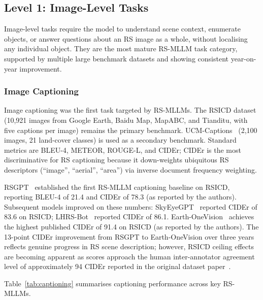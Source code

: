 \subsection{Level 1: Image-Level Tasks}\label{sec4:image}

Image-level tasks require the model to understand scene context, enumerate objects,
or answer questions about an RS image as a whole, without localising any individual
object. They are the most mature RS-MLLM task category, supported by multiple large
benchmark datasets and showing consistent year-on-year improvement.

\subsubsection{Image Captioning}\label{sec4:caption}

Image captioning was the first task targeted by RS-MLLMs. The RSICD
dataset~\cite{rsicd2017} (10,921 images from Google Earth, Baidu Map, MapABC, and
Tianditu, with five captions per image) remains the primary benchmark.
UCM-Captions~\cite{ucmcaptions2016} (2,100 images, 21 land-cover classes) is used
as a secondary benchmark. Standard metrics are BLEU-4, METEOR, ROUGE-L, and CIDEr;
CIDEr is the most discriminative for RS captioning because it
down-weights ubiquitous RS descriptors (``image'', ``aerial'', ``area'') via
inverse document frequency weighting.

RSGPT~\cite{rsgpt2023} established the first RS-MLLM captioning baseline on RSICD,
reporting BLEU-4 of 21.4 and CIDEr of 78.3 (as reported by the authors). Subsequent
models improved on these numbers: SkyEyeGPT~\cite{skyeyegpt2025} reported CIDEr
of 83.6 on RSICD; LHRS-Bot~\cite{lhrsbot2024} reported CIDEr of 86.1. Earth-OneVision~\cite{earthonevision2026}
achieves the highest published CIDEr of 91.4 on RSICD (as reported by the authors).
The 13-point CIDEr improvement from RSGPT to Earth-OneVision over three years reflects
genuine progress in RS scene description; however, RSICD ceiling effects are becoming
apparent as scores approach the human inter-annotator agreement level of approximately
94 CIDEr reported in the original dataset paper~\cite{rsicd2017}.

Table~\ref{tab:captioning} summarises captioning performance across key RS-MLLMs.

